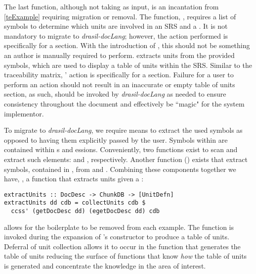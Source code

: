 The last function, although not taking  as input, is an incantation from \autoref{teExample} requiring migration or removal. The function, , requires a list of symbols to determine which units are involved in an SRS and a . It is not mandatory to migrate to \textit{drasil-docLang}; however, the action performed is specifically for a  section. With the introduction of , this should not be something an author is manually required to perform.  extracts units from the provided symbols, which are used to display a table of units within the SRS. Similar to the traceability matrix, ' action is specifically for a section. Failure for a user to perform an action should not result in an inaccurate or empty table of units section, as such,  should be invoked by \textit{drasil-docLang} as needed to ensure consistency throughout the document and effectively be ``magic" for the system implementor. 

To migrate  to \textit{drasil-docLang}, we require means to extract the used symbols as opposed to having them explicitly passed by the user. Symbols within  are contained within s and essions. Conveniently, two functions exist to scan  and extract such elements:  and , respectively. Another function () exists that extract symbols, contained in , from  and . Combining these components together we have, , a function that extracts units given a :

\begin{tcolorbox}
\begin{verbatim}
extractUnits :: DocDesc -> ChunkDB -> [UnitDefn]
extractUnits dd cdb = collectUnits cdb $
  ccss' (getDocDesc dd) (egetDocDesc dd) cdb
\end{verbatim}
\end{tcolorbox}

 allows for the  boilerplate to be removed from each example. The function is invoked during the expansion of 's constructor to produce a table of units. Deferral of unit collection allows it to occur in the function that generates the table of units reducing the surface of functions that know \textit{how} the table of units is generated and concentrate the knowledge in the area of interest.

